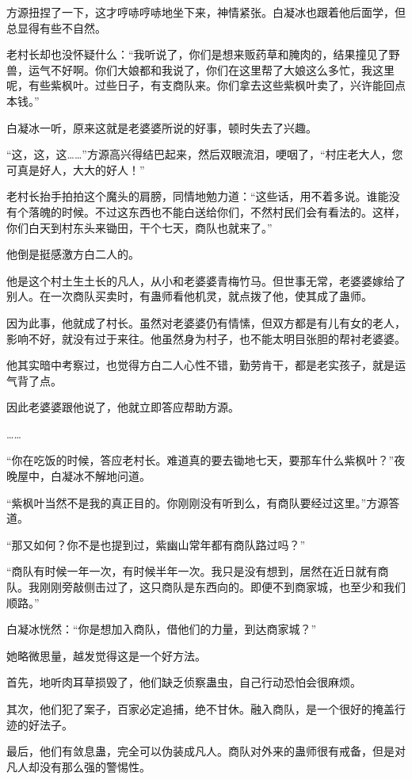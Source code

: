 \begin{this_body}
方源扭捏了一下，这才哼哧哼哧地坐下来，神情紧张。白凝冰也跟着他后面学，但总显得有些不自然。

老村长却也没怀疑什么：“我听说了，你们是想来贩药草和腌肉的，结果撞见了野兽，运气不好啊。你们大娘都和我说了，你们在这里帮了大娘这么多忙，我这里呢，有些紫枫叶。过些日子，有支商队来。你们拿去这些紫枫叶卖了，兴许能回点本钱。”

白凝冰一听，原来这就是老婆婆所说的好事，顿时失去了兴趣。

“这，这，这……”方源高兴得结巴起来，然后双眼流泪，哽咽了，“村庄老大人，您可真是好人，大大的好人！”

老村长抬手拍拍这个魔头的肩膀，同情地勉力道：“这些话，用不着多说。谁能没有个落魄的时候。不过这东西也不能白送给你们，不然村民们会有看法的。这样，你们白天到村东头来锄田，干个七天，商队也就来了。”

他倒是挺感激方白二人的。

他是这个村土生土长的凡人，从小和老婆婆青梅竹马。但世事无常，老婆婆嫁给了别人。在一次商队买卖时，有蛊师看他机灵，就点拨了他，使其成了蛊师。

因为此事，他就成了村长。虽然对老婆婆仍有情愫，但双方都是有儿有女的老人，影响不好，就没有过于来往。他虽然身为村子，也不能太明目张胆的帮衬老婆婆。

他其实暗中考察过，也觉得方白二人心性不错，勤劳肯干，都是老实孩子，就是运气背了点。

因此老婆婆跟他说了，他就立即答应帮助方源。

……

“你在吃饭的时候，答应老村长。难道真的要去锄地七天，要那车什么紫枫叶？”夜晚屋中，白凝冰不解地问道。

“紫枫叶当然不是我的真正目的。你刚刚没有听到么，有商队要经过这里。”方源答道。

“那又如何？你不是也提到过，紫幽山常年都有商队路过吗？”

“商队有时候一年一次，有时候半年一次。我只是没有想到，居然在近日就有商队。我刚刚旁敲侧击过了，这只商队是东西向的。即便不到商家城，也至少和我们顺路。”

白凝冰恍然：“你是想加入商队，借他们的力量，到达商家城？”

她略微思量，越发觉得这是一个好方法。

首先，地听肉耳草损毁了，他们缺乏侦察蛊虫，自己行动恐怕会很麻烦。

其次，他们犯了案子，百家必定追捕，绝不甘休。融入商队，是一个很好的掩盖行迹的好法子。

最后，他们有敛息蛊，完全可以伪装成凡人。商队对外来的蛊师很有戒备，但是对凡人却没有那么强的警惕性。


\end{this_body}
